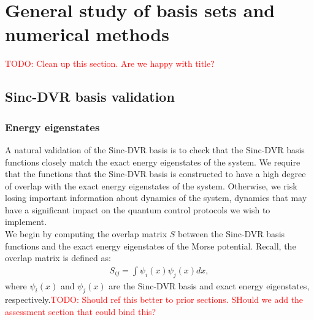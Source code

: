 \documentclass{subfiles}
\begin{document}
\section{General study of basis sets and numerical methods}\label{sec:general_study_results}
\textcolor{red}{TODO: Clean up this section. Are we happy with title?}
\subsection{Sinc-DVR basis validation}
\subsubsection*{Energy eigenstates}
A natural validation of the Sinc-DVR basis is to check that the Sinc-DVR basis functions closely match the exact energy eigenstates of the system. We require that the functions that the Sinc-DVR basis is constructed to have a high degree of overlap with the exact energy eigenstates of the system. Otherwise, we risk losing important information about dynamics of the system, dynamics that may have a significant impact on the quantum control protocols we wish to implement.\\ 

We begin by computing the overlap matrix $S$ between the Sinc-DVR basis functions and the exact energy eigenstates of the Morse potential. Recall, the overlap matrix is defined as:
\begin{align*}
    S_{ij} = \int \psi_i(x) \psi_j(x) dx,
\end{align*}
where $\psi_i(x)$ and $\psi_j(x)$ are the Sinc-DVR basis and exact energy eigenstates, respectively.\textcolor{red}{TODO: Should ref this better to prior sections. SHould we add the assessment section that could bind this?} 
\end{document}
